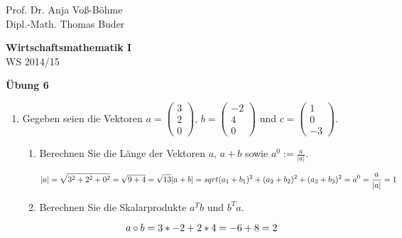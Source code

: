 \documentclass[12pt,a4paper]{scrreprt}
\begin{document}
 
\begin{flushleft}
Prof. Dr.  Anja Voß-Böhme \\
Dipl.-Math. Thomas Buder
\end{flushleft}

\begin{center}
\large{\textbf{ Wirtschaftsmathematik I}} \\
WS 2014/15 \end{center}

\begin{center}\large{\textbf{ Übung 6 }} \end{center}

\bigskip
\begin{enumerate}
	\item	Gegeben seien die Vektoren %
		$a=\begin{pmatrix}
			3 \\
			2\\
			0
		\end{pmatrix}$,
        $b=\begin{pmatrix}
			-2 \\
			4\\
			0
		\end{pmatrix}$ und
        $c=\begin{pmatrix}
			1 \\
			0\\
			-3
		\end{pmatrix}.$
	\begin{enumerate}
		\item Berechnen Sie die Länge der Vektoren $a$, $a+b$ sowie $a^0:=\frac{a}{|a|}$.
        
        \begin{equation}
        	|a| = \sqrt{3^2+2^2+0^2} = \sqrt{9+4} = \sqrt{13} \\
    	    |a+b| = sqrt{(a_1+b_1)^2+(a_2+b_2)^2+(a_3+b_3)^2} =  \\
	        a^0=\frac{a}{|a|}=1 \\
        \end{equation}
        
	\item Berechnen Sie die Skalarprodukte $a^Tb$ und  $b^Ta$.

        \begin{equation}
a \circ b = 3*-2+2*4 = -6+8 = 2 \\


\end{equation}
\end{enumerate}
\end{enumerate}
\end{document}
